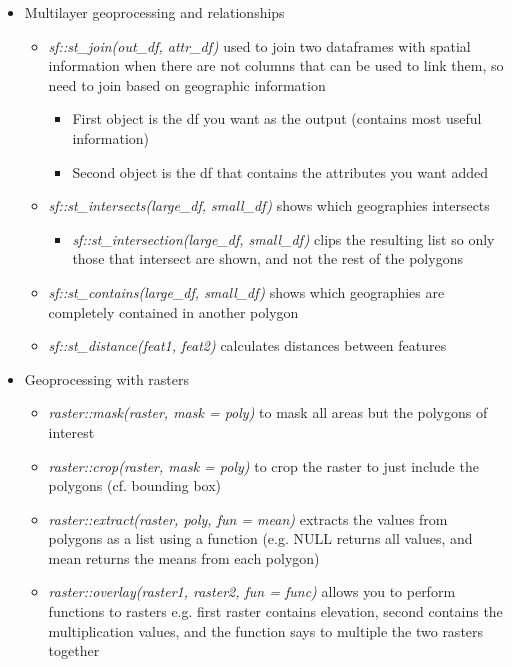 \documentclass{article}
\begin{document}
\begin{itemize}
\begin{itemize}
\begin{itemize}
        \end{itemize}
    \end{itemize}
    \item Multilayer geoprocessing and relationships
    \begin{itemize}
        \item \textit{sf::st\_join(out\_df, attr\_df)} used to join two dataframes with spatial information when there are not columns that can be used to link them, so need to join based on geographic information
        \begin{itemize}
            \item First object is the df you want as the output (contains most useful information)
            \item Second object is the df that contains the attributes you want added
        \end{itemize}
        \item \textit{sf::st\_intersects(large\_df, small\_df)} shows which geographies intersects
        \begin{itemize}
            \item \textit{sf::st\_intersection(large\_df, small\_df)} clips the resulting list so only those that intersect are shown, and not the rest of the polygons
        \end{itemize}
        \item \textit{sf::st\_contains(large\_df, small\_df)} shows which geographies are completely contained in another polygon
        \item \textit{sf::st\_distance(feat1, feat2)} calculates distances between features
    \end{itemize}
    \item Geoprocessing with rasters
    \begin{itemize}
        \item \textit{raster::mask(raster, mask = poly)} to mask all areas but the polygons of interest
        \item \textit{raster::crop(raster, mask = poly)} to crop the raster to just include the polygons (cf. bounding box) 
        \item\textit{raster::extract(raster, poly, fun = mean)} extracts the values from polygons as a list using a function (e.g. NULL returns all values, and mean returns the means from each polygon)
        \item \textit{raster::overlay(raster1, raster2, fun = func)} allows you to perform functions to rasters e.g. first raster contains elevation, second contains the multiplication values, and the function says to multiple the two rasters together

\end{itemize}
\end{itemize}
\end{document}
